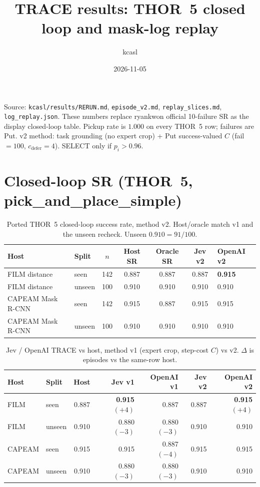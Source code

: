 \documentclass[11pt]{article}
\title{TRACE results: THOR~5 closed loop and mask-log replay}
\author{kcasl}
\date{2026-11-05}
\begin{document}
\maketitle
\noindent
Source: \texttt{kcasl/results/RERUN.md}, \texttt{episode\_v2.md}, \texttt{replay\_slices.md}, \texttt{log\_replay.json}.
These numbers replace ryankwon official 10-failure SR as the display closed-loop table.
Pickup rate is $1.000$ on every THOR~5 row; failures are Put.
v2 method: task grounding (no expert crop) + Put success-valued $C$ (fail${=}100$, $c_{\mathrm{defer}}{=}4$).
SELECT only if $p_i>0.96$.

\section{Closed-loop SR (THOR~5, pick\_and\_place\_simple)}
\label{sec:sr}

\begin{table}[t]
\centering
\caption{Ported THOR~5 closed-loop success rate, method v2. Host/oracle match v1 and the unseen recheck. Unseen $0.910=91/100$.}
\label{tab:thor-sr-v2}
\scriptsize
\begin{tabular}{llcccc}
\toprule
Host & Split & $n$ & Host SR & Oracle SR & Jev v2 & OpenAI v2 \\
\midrule
FILM distance & seen & 142 & 0.887 & 0.887 & 0.887 & \textbf{0.915} \\
FILM distance & unseen & 100 & 0.910 & 0.910 & 0.910 & 0.910 \\
CAPEAM Mask R-CNN & seen & 142 & 0.915 & 0.887 & 0.915 & 0.915 \\
CAPEAM Mask R-CNN & unseen & 100 & 0.910 & 0.910 & 0.910 & 0.910 \\
\bottomrule
\end{tabular}
\end{table}

\begin{table}[t]
\centering
\caption{Jev / OpenAI TRACE vs host, method v1 (expert crop, step-cost $C$) vs v2. $\Delta$ is episodes vs the same-row host.}
\label{tab:thor-v1v2}
\scriptsize
\begin{tabular}{llcrrrr}
\toprule
Host & Split & Host & Jev v1 & OpenAI v1 & Jev v2 & OpenAI v2 \\
\midrule
FILM & seen & 0.887 & \textbf{0.915} $(+4)$ & 0.887 & 0.887 & \textbf{0.915} $(+4)$ \\
FILM & unseen & 0.910 & 0.880 $(-3)$ & 0.880 $(-3)$ & 0.910 & 0.910 \\
CAPEAM & seen & 0.915 & 0.915 & 0.887 $(-4)$ & 0.915 & 0.915 \\
CAPEAM & unseen & 0.910 & 0.880 $(-3)$ & 0.880 $(-3)$ & 0.910 & 0.910 \\
\bottomrule
\end{tabular}
\end{table}
\end{document}
